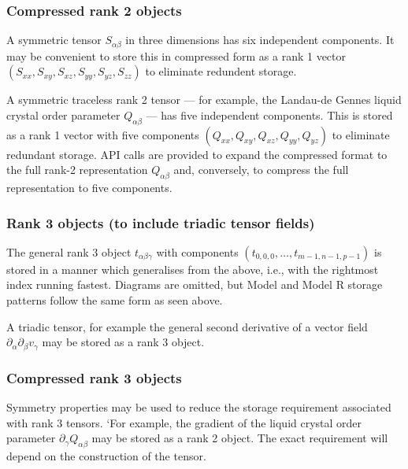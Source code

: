 
\subsubsection{Compressed rank 2 objects}

A symmetric tensor $S_{\alpha\beta}$ in three dimensions has six independent
components. It may be convenient to store this in compressed form as a
rank 1 vector $(S_{xx}, S_{xy}, S_{xz}, S_{yy}, S_{yz}, S_{zz})$ to eliminate
redundent storage.

A symmetric traceless rank 2 tensor --- for example, the Landau-de Gennes
liquid crystal order parameter $Q_{\alpha\beta}$ --- has five independent
components. This is stored as a rank 1 vector with five components
$(Q_{xx}, Q_{xy}, Q_{xz}, Q_{yy}, Q_{yz})$ to eliminate redundant
storage. API calls are provided to expand the compressed format to the
full rank-2 representation $Q_{\alpha\beta}$ and, conversely, to compress
the full representation to five components.

\subsubsection{Rank 3 objects (to include triadic tensor fields)}

The general rank 3 object $t_{\alpha\beta\gamma}$ with components
$(t_{0,0,0}, \ldots, t_{m-1,n-1,p-1})$ is stored in a manner which
generalises from the above, i.e., with the rightmost index running
fastest. Diagrams are omitted, but Model and Model R storage patterns
follow the same form as seen above.

A triadic tensor, for example the general second derivative of a vector
field $\partial_\alpha \partial_\beta v_\gamma$ may be stored as a rank
3 object.

\subsubsection{Compressed rank 3 objects}

Symmetry properties may be used to reduce the storage requirement
associated with rank 3 tensors. `For example, the gradient of the
liquid crystal order parameter $\partial_\gamma Q_{\alpha\beta}$
may be stored as a rank 2 object. The exact requirement will depend
on the construction of the tensor.

%


